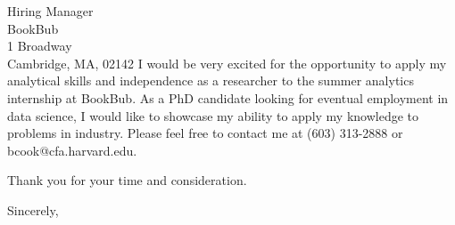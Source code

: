 \documentclass{letter}
\begin{document}
\begin{letter}{Hiring Manager\\
    BookBub\\ 1 Broadway\\Cambridge, MA, 02142}
\noindent I would be very excited for the opportunity to apply my
analytical skills and independence as a researcher to the summer
analytics internship at BookBub. As a PhD candidate
looking for eventual employment in data science, I would like
to showcase my ability to apply my knowledge to problems in industry.
Please feel free to contact me at (603) 313-2888 or
bcook@cfa.harvard.edu.

Thank you for your time and consideration.


\closing{Sincerely,}


\end{letter}
\end{document}
